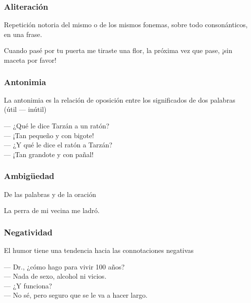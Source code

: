 \begin{frame}
    \frametitle{Aliteración}

    Repetición notoria del mismo o de los mismos fonemas, sobre todo consonánticos, en una frase.
    \begin{example}
        Cuando pasé por tu puerta me tiraste una flor, la próxima vez que pase, ¡sin maceta por favor!
    \end{example}
\end{frame}

\begin{frame}
    \frametitle{Antonimia}
    
    La antonimia es la relación de oposición entre los significados de dos palabras (útil --- inútil)
    \begin{example}
        --- ¿Qué le dice Tarzán a un ratón? \\
        --- ¡Tan pequeño y con bigote! \\
        --- ¿Y qué le dice el ratón a Tarzán? \\
        --- ¡Tan grandote y con pañal! \\
    \end{example}
\end{frame}

\begin{frame}
    \frametitle{Ambigüedad}
    
    De las palabras y de la oración
    \begin{example}
        La perra de mi vecina me ladró.
    \end{example}
\end{frame}

\begin{frame}
    \frametitle{Negatividad}
    
    El humor tiene una tendencia hacia las connotaciones negativas
    \begin{example}
        --- Dr., ¿cómo hago para vivir 100 años? \\
        --- Nada de sexo, alcohol ni vicios. \\
        --- ¿Y funciona? \\
        --- No sé, pero seguro que se le va a hacer largo.
    \end{example}
\end{frame}

